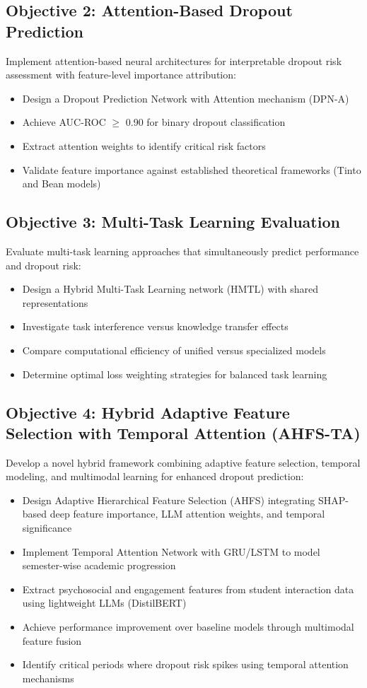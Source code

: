 \subsection{Objective 2: Attention-Based Dropout Prediction}

Implement attention-based neural architectures for interpretable dropout risk assessment with feature-level importance attribution:
\begin{itemize}
\item Design a Dropout Prediction Network with Attention mechanism (DPN-A)
\item Achieve AUC-ROC $\geq$ 0.90 for binary dropout classification
\item Extract attention weights to identify critical risk factors
\item Validate feature importance against established theoretical frameworks (Tinto and Bean models)
\end{itemize}

\subsection{Objective 3: Multi-Task Learning Evaluation}

Evaluate multi-task learning approaches that simultaneously predict performance and dropout risk:
\begin{itemize}
\item Design a Hybrid Multi-Task Learning network (HMTL) with shared representations
\item Investigate task interference versus knowledge transfer effects
\item Compare computational efficiency of unified versus specialized models
\item Determine optimal loss weighting strategies for balanced task learning
\end{itemize}

\subsection{Objective 4: Hybrid Adaptive Feature Selection with Temporal Attention (AHFS-TA)}

Develop a novel hybrid framework combining adaptive feature selection, temporal modeling, and multimodal learning for enhanced dropout prediction:
\begin{itemize}
\item Design Adaptive Hierarchical Feature Selection (AHFS) integrating SHAP-based deep feature importance, LLM attention weights, and temporal significance
\item Implement Temporal Attention Network with GRU/LSTM to model semester-wise academic progression
\item Extract psychosocial and engagement features from student interaction data using lightweight LLMs (DistilBERT)
\item Achieve performance improvement over baseline models through multimodal feature fusion
\item Identify critical periods where dropout risk spikes using temporal attention mechanisms
\end{itemize}

